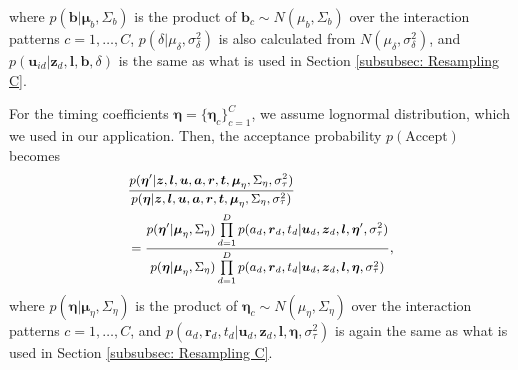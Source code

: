 \documentclass[twoside]{article}
\begin{document}
     	      where $p(\boldsymbol{b}|\boldsymbol{\mu}_b, \Sigma_b)$ is the product of $\boldsymbol{b}_c\sim N(\mu_{b}, \Sigma_{b})$ over the interaction patterns $c =1,\ldots, C$, $p(\delta|\mu_\delta, \sigma^2_\delta)$ is also calculated from $N(\mu_\delta, \sigma^2_\delta)$, and $p(\boldsymbol{u}_{id}| \boldsymbol{z}_d,  \boldsymbol{l}, \boldsymbol{b}, \delta)$ is the same as what is used in Section \ref{subsubsec: Resampling C}. 
     	       
  For the timing coefficients $\boldsymbol{\eta} =\{\boldsymbol{\eta}_c\}_{c=1}^C$, we assume lognormal distribution, which we used in our application. Then, the acceptance probability $p(\mbox{Accept})$ becomes
    \begin{equation*}
    \footnotesize
    \begin{aligned}
       &\frac{p(\boldsymbol{\eta}^\prime|  \boldsymbol{z},\boldsymbol{l}, \boldsymbol{u},\boldsymbol{a}, \boldsymbol{r}, \boldsymbol{t},\boldsymbol{\mu}_\eta, \Sigma_\eta, {\sigma_\tau^2})}{p(\boldsymbol{\eta}|\boldsymbol{z},\boldsymbol{l}, \boldsymbol{u},\boldsymbol{a}, \boldsymbol{r}, \boldsymbol{t},\boldsymbol{\mu}_\eta, \Sigma_\eta, {\sigma_\tau^2})}
       \\& =\frac{p(\boldsymbol{\eta}^\prime|\boldsymbol{\mu}_\eta, \Sigma_\eta) \prod\limits_{d=1}^D p({a}_{d}, \boldsymbol{r}_d, t_d| \boldsymbol{u}_d, \boldsymbol{z}_d,  \boldsymbol{l}, \boldsymbol{\eta}^\prime, {\sigma_\tau^2})}{p(\boldsymbol{\eta}|\boldsymbol{\mu}_\eta, \Sigma_\eta) \prod\limits_{d=1}^Dp({a}_{d}, \boldsymbol{r}_d, t_d| \boldsymbol{u}_d, \boldsymbol{z}_d,  \boldsymbol{l}, \boldsymbol{\eta}, {\sigma_\tau^2})},
    \end{aligned}
    \end{equation*}
       where $p(\boldsymbol{\eta}|\boldsymbol{\mu}_\eta, \Sigma_\eta)$ is the product of $\boldsymbol{\eta}_c\sim N(\mu_{\eta}, \Sigma_{\eta})$ over the interaction patterns $c =1,\ldots, C$, and $p({a}_{d}, \boldsymbol{r}_d, t_d| \boldsymbol{u}_d, \boldsymbol{z}_d,  \boldsymbol{l}, \boldsymbol{\eta}, \sigma_\tau^{2})$ is again the same as what is used in Section \ref{subsubsec: Resampling C}. 
       
\end{document}
